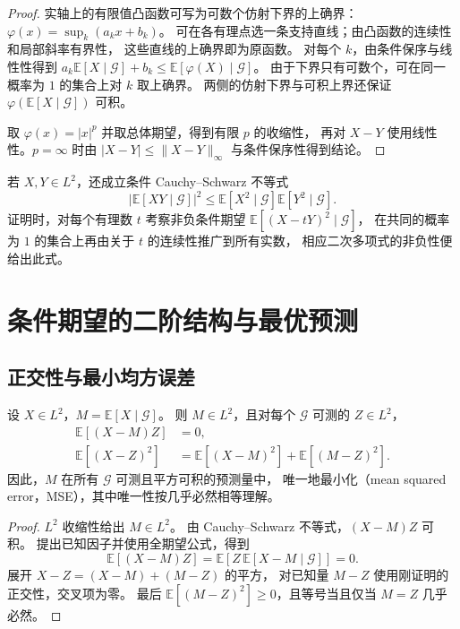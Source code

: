 \documentclass[UTF8]{ctexart}
\begin{document}
\begin{proof}
实轴上的有限值凸函数可写为可数个仿射下界的上确界：
$\varphi(x)=\sup_k(a_kx+b_k)$。
可在各有理点选一条支持直线；由凸函数的连续性和局部斜率有界性，
这些直线的上确界即为原函数。
对每个 $k$，由条件保序与线性性得到
$a_k\mathbb E[X\mid\mathcal G]+b_k
\leq\mathbb E[\varphi(X)\mid\mathcal G]$。
由于下界只有可数个，可在同一概率为 $1$ 的集合上对 $k$ 取上确界。
两侧的仿射下界与可积上界还保证 $\varphi(\mathbb E[X\mid\mathcal G])$ 可积。

取 $\varphi(x)=|x|^p$ 并取总体期望，得到有限 $p$ 的收缩性，
再对 $X-Y$ 使用线性性。$p=\infty$ 时由
$|X-Y|\leq\|X-Y\|_\infty$ 与条件保序性得到结论。
\end{proof}

若 $X,Y\in L^2$，还成立条件 Cauchy--Schwarz 不等式
\[
  |\mathbb E[XY\mid\mathcal G]|^2
  \leq\mathbb E[X^2\mid\mathcal G]\mathbb E[Y^2\mid\mathcal G].
\]
证明时，对每个有理数 $t$ 考察非负条件期望
$\mathbb E[(X-tY)^2\mid\mathcal G]$，
在共同的概率为 $1$ 的集合上再由关于 $t$ 的连续性推广到所有实数，
相应二次多项式的非负性便给出此式。

\section{条件期望的二阶结构与最优预测}
\label{sec:conditional-projection}

\subsection{正交性与最小均方误差}

\begin{theorem}[条件期望的正交投影性质]
\label{thm:conditional-projection}
设 $X\in L^2$，$M=\mathbb E[X\mid\mathcal G]$。
则 $M\in L^2$，且对每个 $\mathcal G$ 可测的 $Z\in L^2$，
\begin{align}
  \mathbb E[(X-M)Z]&=0,
    \label{eq:conditional-orthogonality}\\
  \mathbb E[(X-Z)^2]
    &=\mathbb E[(X-M)^2]+\mathbb E[(M-Z)^2].
    \label{eq:conditional-pythagoras}
\end{align}
因此，$M$ 在所有 $\mathcal G$ 可测且平方可积的预测量中，
唯一地最小化（mean squared error，MSE），其中唯一性按几乎必然相等理解。
\end{theorem}

\begin{proof}
$L^2$ 收缩性给出 $M\in L^2$。
由 Cauchy--Schwarz 不等式，$(X-M)Z$ 可积。
提出已知因子并使用全期望公式，得到
\[
  \mathbb E[(X-M)Z]
  =\mathbb E[Z\,\mathbb E[X-M\mid\mathcal G]]=0.
\]
展开 $X-Z=(X-M)+(M-Z)$ 的平方，
对已知量 $M-Z$ 使用刚证明的正交性，交叉项为零。
最后 $\mathbb E[(M-Z)^2]\geq0$，且等号当且仅当 $M=Z$ 几乎必然。
\end{proof}
\end{document}
